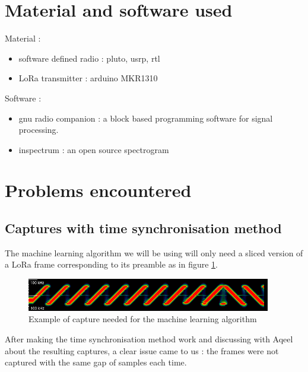 \documentclass[a4paper, 12pt]{article}
\begin{document}
\section{Material and software used}
Material :
\begin{itemize}
  \item software defined radio : pluto, usrp, rtl
  \item LoRa transmitter : arduino MKR1310
\end{itemize}
Software : 
\begin{itemize}
  \item gnu radio companion : a block based programming software for signal processing.
  \item inspectrum : an open source spectrogram
\end{itemize}


\section{Problems encountered} 
\subsection{Captures with time synchronisation method}
The machine learning algorithm we will be using will only need a sliced version of a LoRa frame corresponding to its preamble as in figure \ref{fig:lorapreambule}. 

\begin{figure}[H]
  \begin{center}
    \includegraphics[width=0.95\textwidth]{images/LoRaFrame.png}
  \end{center}
  \caption{Example of capture needed for the machine learning algorithm}\label{fig:lorapreambule}
\end{figure}


After making the time synchronisation method work and discussing with Aqeel about the resulting captures, a clear issue came to us :
the frames were not captured with the same gap of samples each time. 
\end{document}
